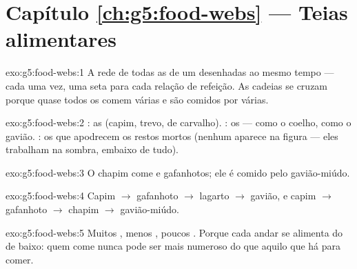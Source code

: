 \section*{Capítulo \ref{ch:g5:food-webs} --- Teias alimentares}

\begin{solution}{exo:g5:food-webs:1}
A rede de todas as  de um  desenhadas ao
mesmo tempo --- cada  uma vez, uma seta para cada relação de
refeição. As cadeias se cruzam porque quase todos os  comem
várias  e são comidos por várias.
\end{solution}

\begin{solution}{exo:g5:food-webs:2}
: as  (capim, trevo,  de carvalho).
: os  ---  como o coelho, 
como o gavião. : os que apodrecem os restos mortos
(nenhum aparece na figura --- eles trabalham na sombra, embaixo de
tudo).
\end{solution}

\begin{solution}{exo:g5:food-webs:3}
O chapim come  e gafanhotos; ele é comido pelo gavião-miúdo.
\end{solution}

\begin{solution}{exo:g5:food-webs:4}
Capim $\rightarrow$ gafanhoto $\rightarrow$ lagarto $\rightarrow$
gavião, e capim $\rightarrow$ gafanhoto $\rightarrow$ chapim
$\rightarrow$ gavião-miúdo.
\end{solution}

\begin{solution}{exo:g5:food-webs:5}
Muitos , menos , poucos . Porque cada
andar se alimenta do de baixo: quem come nunca pode ser mais numeroso
do que aquilo que há para comer.
\end{solution}

